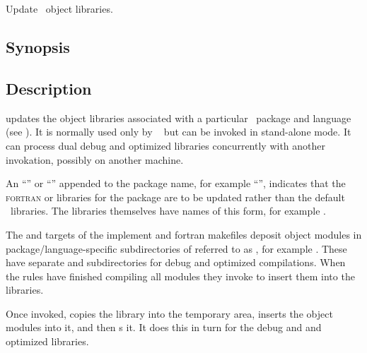 
\newpage
\section{}
\label{updatelib}

Update \aipspp\ object libraries.

\subsection*{Synopsis}

\begin{synopsis}
\end{synopsis}

\subsection*{Description}

 updates the object libraries associated with a particular
\aipspp\ package and language (see ).  It is normally used only
by \aipspp\  but can be invoked in stand-alone mode.  It can
process dual debug and optimized libraries concurrently with another
invokation, possibly on another machine.

An ``'' or ``'' appended to the package name, for example
``'', indicates that the \textsc{fortran} or 
libraries for the package are to be updated rather than the default
\cplusplus\ libraries.  The libraries themselves have names of this form, for
example .

The  and  targets of the implement and fortran
makefiles deposit object modules in package/language-specific subdirectories
of  referred to as , for example
.  These have separate  and 
subdirectories for debug and optimized compilations.  When the 
rules have finished compiling all modules they invoke  to
insert them into the libraries.

Once invoked,  copies the library into the temporary area,
inserts the object modules into it, and then s it.  It does
this in turn for the debug and and optimized libraries.

